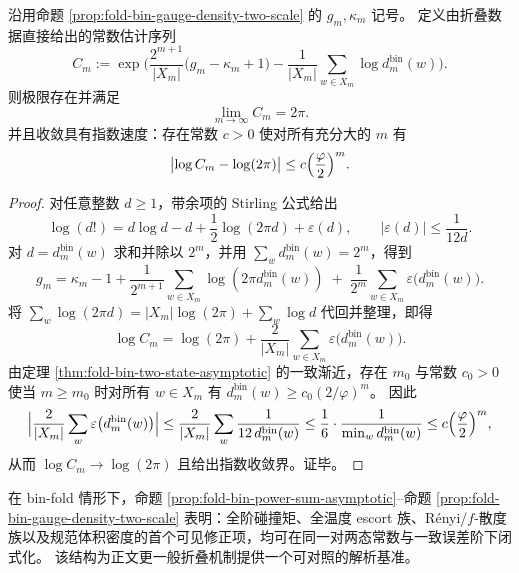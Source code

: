 \begin{corollary}\label{cor:fold-bin-recover-2pi}
沿用命题 \ref{prop:fold-bin-gauge-density-two-scale} 的 \(g_m,\kappa_m\) 记号。
定义由折叠数据直接给出的常数估计序列
\[
C_m
:=\exp\!\Biggl(
\frac{2^{m+1}}{|X_m|}\bigl(g_m-\kappa_m+1\bigr)
-\frac{1}{|X_m|}\sum_{w\in X_m}\log d^{\mathrm{bin}}_m(w)
\Biggr).
\]
则极限存在并满足
\[
\lim_{m\to\infty}C_m=2\pi.
\]
并且收敛具有指数速度：存在常数 \(c>0\) 使对所有充分大的 \(m\) 有
\[
\bigl|\log C_m-\log(2\pi)\bigr|\le c\Bigl(\frac{\varphi}{2}\Bigr)^m.
\]
\end{corollary}
\begin{proof}
对任意整数 \(d\ge 1\)，带余项的 Stirling 公式给出
\[
\log(d!)=d\log d-d+\frac12\log(2\pi d)+\varepsilon(d),
\qquad |\varepsilon(d)|\le \frac{1}{12d}.
\]
对 \(d=d^{\mathrm{bin}}_m(w)\) 求和并除以 \(2^m\)，并用 \(\sum_w d^{\mathrm{bin}}_m(w)=2^m\)，得到
\[
g_m
=\kappa_m-1+\frac{1}{2^{m+1}}\sum_{w\in X_m}\log(2\pi d^{\mathrm{bin}}_m(w))
\;+\;\frac{1}{2^m}\sum_{w\in X_m}\varepsilon\bigl(d^{\mathrm{bin}}_m(w)\bigr).
\]
将
\(
\sum_w \log(2\pi d)=|X_m|\log(2\pi)+\sum_w \log d
\)
代回并整理，即得
\[
\log C_m=\log(2\pi)+\frac{2}{|X_m|}\sum_{w\in X_m}\varepsilon\bigl(d^{\mathrm{bin}}_m(w)\bigr).
\]
由定理 \ref{thm:fold-bin-two-state-asymptotic} 的一致渐近，存在 \(m_0\) 与常数 \(c_0>0\) 使当 \(m\ge m_0\) 时对所有 \(w\in X_m\) 有
\(
d^{\mathrm{bin}}_m(w)\ge c_0(2/\varphi)^m
\)。
因此
\[
\Bigl|\frac{2}{|X_m|}\sum_{w}\varepsilon\bigl(d^{\mathrm{bin}}_m(w)\bigr)\Bigr|
\le \frac{2}{|X_m|}\sum_{w}\frac{1}{12\,d^{\mathrm{bin}}_m(w)}
\le \frac{1}{6}\cdot \frac{1}{\min_w d^{\mathrm{bin}}_m(w)}
\le c\Bigl(\frac{\varphi}{2}\Bigr)^m,
\]
从而 \(\log C_m\to\log(2\pi)\) 且给出指数收敛界。证毕。
\end{proof}




\begin{remark}[两态压缩作为解析基准解]\label{rem:fold-bin-solvable-model}
在 bin-fold 情形下，命题 \ref{prop:fold-bin-power-sum-asymptotic}--命题 \ref{prop:fold-bin-gauge-density-two-scale} 表明：全阶碰撞矩、全温度 escort 族、Rényi/\(f\)-散度族以及规范体积密度的首个可见修正项，均可在同一对两态常数与一致误差阶下闭式化。
该结构为正文更一般折叠机制提供一个可对照的解析基准。
\end{remark}



